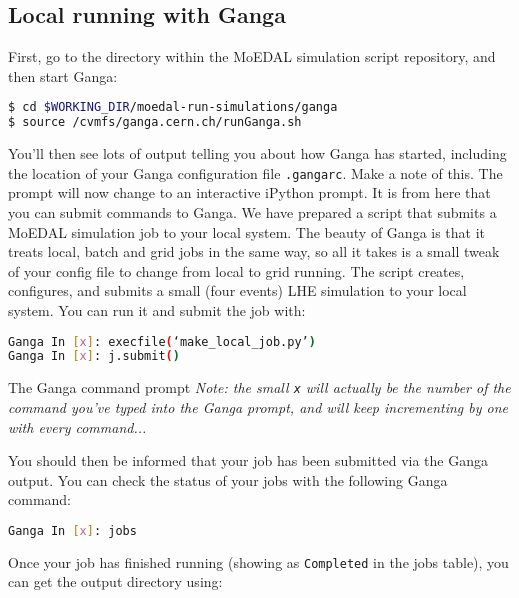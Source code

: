 \subsection{Local running with Ganga}
\label{sec:moedallocalrunning}
First, go to the  directory within the \ac{MoEDAL} simulation script
repository, and then start Ganga:

\begin{lstlisting}[gobble=0,numbers=none,language=bash]
$ cd $WORKING_DIR/moedal-run-simulations/ganga
$ source /cvmfs/ganga.cern.ch/runGanga.sh 
\end{lstlisting}

You'll then see lots of output telling you about how Ganga has started,
including the location of your Ganga configuration file \texttt{.gangarc}.
Make a note of this.
The prompt will now change to an interactive iPython prompt.
It is from here that you can submit commands to Ganga.
We have prepared a script that submits a MoEDAL simulation
job to your local system. The beauty of Ganga is that it treats
local, batch and grid jobs in the same way, so all it takes is a small
tweak of your config file to change from local to grid running.
The script creates, configures, and submits
a small (four events) LHE simulation to your local system.
You can run it and submit the job with:

\begin{lstlisting}[gobble=0,numbers=none,language=bash]
Ganga In [x]: execfile(‘make_local_job.py’) 
Ganga In [x]: j.submit()
\end{lstlisting}

\begin{hintbox}{The Ganga command prompt}
\emph{Note: the small \texttt{x} will actually be the number of the command
you've typed into the Ganga prompt, and will keep incrementing
by one with every command...}
\end{hintbox}

You should then be informed that your job has been submitted via the
Ganga output.
You can check the status of your jobs with the following Ganga command:

\begin{lstlisting}[gobble=0,numbers=none,language=bash]
Ganga In [x]: jobs
\end{lstlisting}

Once your job has finished running (showing as \texttt{Completed} in the jobs table),
you can get the output directory using:

